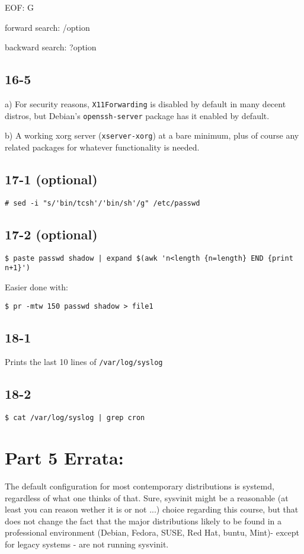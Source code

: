 EOF: G

forward search: /option

backward search: ?option

\subsection{16-5}
a) For security reasons, \verb=X11Forwarding= is disabled by default in many decent distros, but Debian's \verb=openssh-server= package has it enabled by default.

b) A working xorg server (\verb=xserver-xorg=) at a bare minimum, plus of course any related packages for whatever functionality is needed.

\subsection{17-1 (optional)}
\verb=# sed -i "s/'bin/tcsh'/'bin/sh'/g" /etc/passwd=

\subsection{17-2 (optional)}
\begin{verbatim}$ paste passwd shadow | expand $(awk 'n<length {n=length} END {print n+1}')\end{verbatim}

Easier done with:

\verb=$ pr -mtw 150 passwd shadow > file1=

\subsection{18-1}
Prints the last 10 lines of \verb=/var/log/syslog=

\subsection{18-2}
\verb=$ cat /var/log/syslog | grep cron=


\section{Part 5 Errata:}
The default configuration for most contemporary distributions is systemd, regardless of what one thinks of that. Sure, sysvinit might be a reasonable (at least you can reason wether it is or not ...) choice regarding this course, but that does not change the fact that the major distributions likely to be found in a professional environment (Debian, Fedora, SUSE, Red Hat, \*buntu, Mint)- except for legacy systems - are not running sysvinit.

